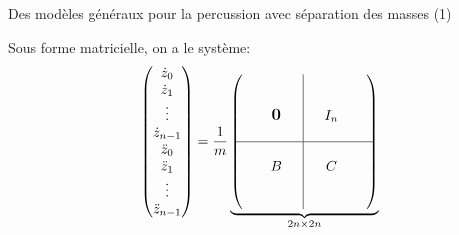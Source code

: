 \begin{frame}{Des modèles généraux pour la percussion avec séparation des masses (1)}

	
	\small
	\vspace*{-0.1cm}
	Sous forme matricielle, on a le système:
	\begin{align} \label{eq:percussion1d4}
    \begin{pmatrix}
        \dot z_0 \\ \dot z_1 \\ \vdots \\ \dot z_{n-1} \\ \ddot z_0 \\ \ddot z_1 \\ \vdots \\ \ddot z_{n-1}
    \end{pmatrix}
    = 
    \frac{1}{m} \underbrace{\begin{pmatrix}
        \begin{matrix}
       & & &  \\ & & &  \\ & & \bigzero & \\ & & & \\      
        \end{matrix}
        & \rvline 
        & \begin{matrix}
        & & & \\ & & &  \\ & I_n & & \\ & & & \\
        \end{matrix}  \\ 
        \hline
        \begin{matrix}
            & & &  \\ & & B & \\ & & & \\ & & & \\     
        \end{matrix}
        & \rvline 
        &\begin{matrix}
            & & & \\ & C & & \\ & & & \\ & & & \\        
        \end{matrix}
      \end{pmatrix}}_{2n \times 2n}

\end{align}
\end{frame}
